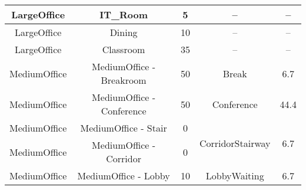 \begin{table}
\begin{tabular}{|c|c|c|c|c|}
LargeOffice            & IT\_Room                     & 5                                                                                                             & --                                & --                                                                                                             \\ \hline
LargeOffice            & Dining                       & 10                                                                                                            & --                                & --                                                                                                             \\ \hline
LargeOffice            & Classroom                    & 35                                                                                                            & --                                & --                                                                                                             \\ \hline
MediumOffice           & MediumOffice - Breakroom     & 50                                                                                                            & Break                             & 6.7                                                                                                            \\ \hline
MediumOffice           & MediumOffice - Conference    & 50                                                                                                            & Conference                        & 44.4                                                                                                           \\ \hline
MediumOffice           & MediumOffice - Stair         & 0                                                                                                             & \multirow{2}{*}{CorridorStairway} & \multirow{2}{*}{6.7}                                                                                           \\ \cline{1-3}
MediumOffice           & MediumOffice - Corridor      & 0                                                                                                             &                                   &                                                                                                                \\ \hline
MediumOffice           & MediumOffice - Lobby         & 10                                                                                                            & LobbyWaiting                      & 6.7                                                                                                            \\ \hline

\end{tabular}
\end{table}
